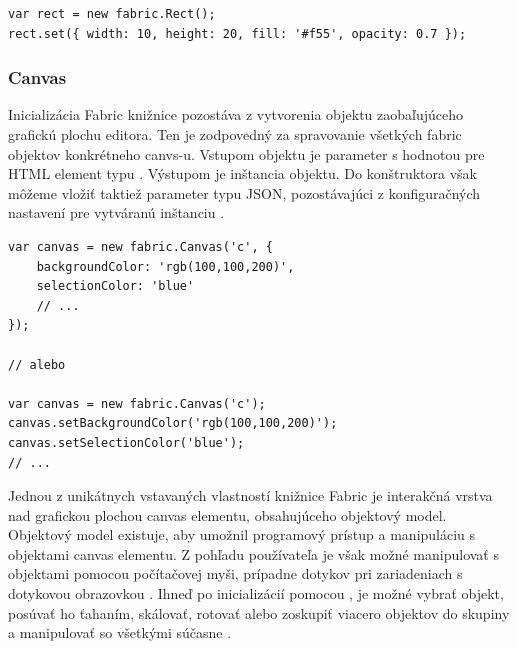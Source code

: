 \begin{lstlisting}[style=web,caption={Vytvorenie objektu typu obdĺžnik pomocou knižnice FabriJS a zmena jeho základných vlastností},captionpos=b, label={lst:fabric.set}]
var rect = new fabric.Rect(); 
rect.set({ width: 10, height: 20, fill: '#f55', opacity: 0.7 }); 
\end{lstlisting}


\subsubsection{Canvas}

Inicializácia Fabric knižnice pozostáva z vytvorenia  objektu zaobaľujúceho grafickú plochu editora. Ten je zodpovedný za spravovanie všetkých fabric objektov konkrétneho canvs-u. Vstupom objektu je parameter s hodnotou  pre HTML element typu . Výstupom je inštancia  objektu. Do konštruktora však môžeme vložiť taktiež parameter typu JSON, pozostávajúci z konfiguračných nastavení pre vytváranú inštanciu . 
\begin{lstlisting}[style=web,caption={Inicializácia Fabric canvas wrappera},captionpos=b, label={lst:fabric.init}]
var canvas = new fabric.Canvas('c', {
	backgroundColor: 'rgb(100,100,200)',
	selectionColor: 'blue'
	// ...
});

// alebo

var canvas = new fabric.Canvas('c');
canvas.setBackgroundColor('rgb(100,100,200)');
canvas.setSelectionColor('blue');
// ...
\end{lstlisting}
Jednou z unikátnych vstavaných vlastností knižnice Fabric je interakčná vrstva nad grafickou plochou canvas elementu, obsahujúceho objektový model. Objektový model existuje, aby umožnil programový prístup a manipuláciu s objektami canvas elementu. Z pohľadu používateľa je však možné manipulovať s objektami pomocou počítačovej myši, prípadne dotykov pri zariadeniach s dotykovou obrazovkou . Ihneď po inicializácií pomocou , je možné vybrať objekt, posúvať ho ťahaním, skálovať, rotovať alebo zoskupiť viacero objektov do skupiny a manipulovať so všetkými súčasne .  

